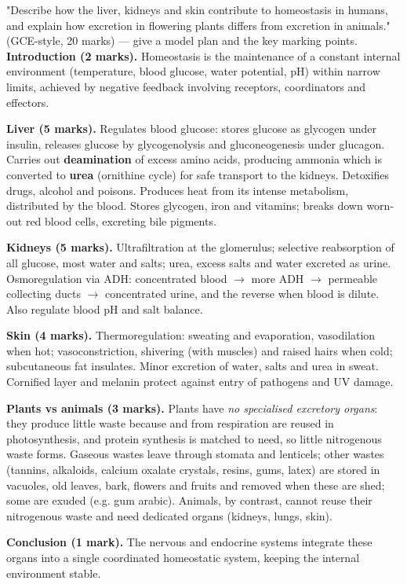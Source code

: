 \documentclass[11pt]{article}
\begin{document}
\begin{exoresolu}
"Describe how the liver, kidneys and skin contribute to homeostasis in humans, and explain how excretion in flowering plants differs from excretion in animals." (GCE-style, 20 marks) — give a model plan and the key marking points.
\tcblower
\textbf{Introduction (2 marks).} Homeostasis is the maintenance of a constant internal environment (temperature, blood glucose, water potential, pH) within narrow limits, achieved by negative feedback involving receptors, coordinators and effectors.

\textbf{Liver (5 marks).} Regulates blood glucose: stores glucose as glycogen under insulin, releases glucose by glycogenolysis and gluconeogenesis under glucagon. Carries out \textbf{deamination} of excess amino acids, producing ammonia which is converted to \textbf{urea} (ornithine cycle) for safe transport to the kidneys. Detoxifies drugs, alcohol and poisons. Produces heat from its intense metabolism, distributed by the blood. Stores glycogen, iron and vitamins; breaks down worn-out red blood cells, excreting bile pigments.

\textbf{Kidneys (5 marks).} Ultrafiltration at the glomerulus; selective reabsorption of all glucose, most water and salts; urea, excess salts and water excreted as urine. Osmoregulation via ADH: concentrated blood $\rightarrow$ more ADH $\rightarrow$ permeable collecting ducts $\rightarrow$ concentrated urine, and the reverse when blood is dilute. Also regulate blood pH and salt balance.

\textbf{Skin (4 marks).} Thermoregulation: sweating and evaporation, vasodilation when hot; vasoconstriction, shivering (with muscles) and raised hairs when cold; subcutaneous fat insulates. Minor excretion of water, salts and urea in sweat. Cornified layer and melanin protect against entry of pathogens and UV damage.

\textbf{Plants vs animals (3 marks).} Plants have \emph{no specialised excretory organs}: they produce little waste because  and  from respiration are reused in photosynthesis, and protein synthesis is matched to need, so little nitrogenous waste forms. Gaseous wastes leave through stomata and lenticels; other wastes (tannins, alkaloids, calcium oxalate crystals, resins, gums, latex) are stored in vacuoles, old leaves, bark, flowers and fruits and removed when these are shed; some are exuded (e.g. gum arabic). Animals, by contrast, cannot reuse their nitrogenous waste and need dedicated organs (kidneys, lungs, skin).

\textbf{Conclusion (1 mark).} The nervous and endocrine systems integrate these organs into a single coordinated homeostatic system, keeping the internal environment stable.
\end{exoresolu}
\end{document}

